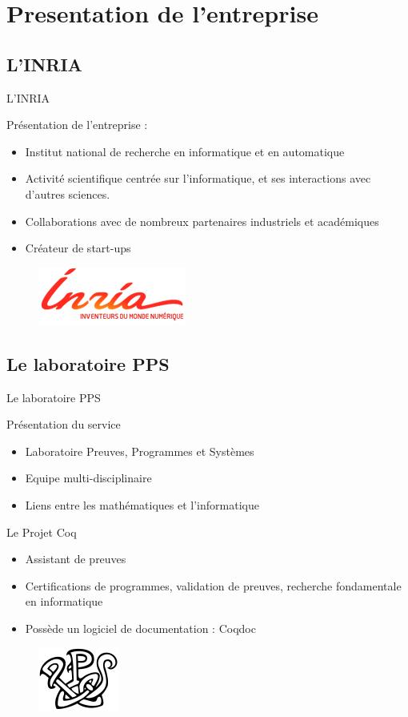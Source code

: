 \documentclass[compress]{beamer}
\newenvironment{tframe}[1]{
  \subsection{#1}
  \begin{frame}{#1}
  }{
  \end{frame}
  }
\begin{document}
\section{Presentation de l'entreprise}
\begin{tframe}{L'INRIA}
  Présentation de l'entreprise :
  \begin{itemize}
    \item Institut national de recherche en informatique et en automatique
    \item Activité scientifique centrée sur l'informatique, et ses interactions
      avec d'autres sciences.
    \item Collaborations avec de nombreux partenaires industriels et académiques
    \item Créateur de start-ups
  \end{itemize}
  \begin{figure}
        \includegraphics[scale=0.4]{../data/inria.jpg}
  \end{figure}
\end{tframe}
\begin{tframe}{Le laboratoire PPS}
  Présentation du service
  \begin{itemize}
    \item Laboratoire Preuves, Programmes et Systèmes
    \item Equipe multi-disciplinaire
    \item Liens entre les mathématiques et l'informatique
  \end{itemize}

  \medskip

  Le Projet Coq
  \begin{itemize}
    \item Assistant de preuves
    \item Certifications de programmes, validation de preuves, recherche
      fondamentale en informatique
    \item Possède un logiciel de documentation : Coqdoc
  \end{itemize}
  \begin{figure}
        \includegraphics[scale=0.6]{../data/pps.png}
  \end{figure}
\end{tframe}
\end{document}

